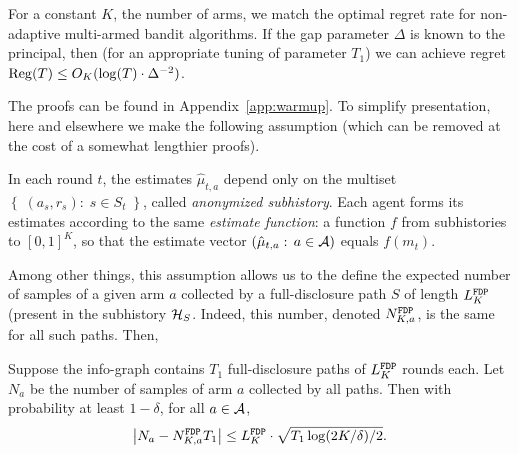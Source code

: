 \begin{remark}
For a constant $K$, the number of arms, we match the optimal regret rate for non-adaptive multi-armed bandit algorithms. If the gap parameter $\Delta$ is known to the principal, then (for an appropriate tuning of parameter $T_1$) we can achieve regret
  $\mathrm{Reg}(T) \leq O_K(\log(T) \cdot \Delta^{-2})$.
\end{remark}

The proofs can be found in Appendix~\ref{app:warmup}. To simplify presentation, here and elsewhere we make the following assumption (which can be removed at the cost of a somewhat lengthier proofs).


\begin{assumption}\label{ass:simplifying}
In each round $t$, the estimates $\hat{\mu}_{t,a}$ depend only on the multiset
    $\left\{\; (a_s,r_s):\;s\in S_t \;\right\}$,
called \emph{anonymized subhistory}. Each agent forms its estimates according to the same \emph{estimate function}: a function $f$ from subhistories to $[0,1]^K$, so that the estimate vector
        $(\hat{\mu}_{t,a}:\, a\in\mathcal{A})$
equals $f(m_t)$.
\end{assumption}

Among other things, this assumption allows us to the define the expected number of samples of a given arm $a$ collected by a full-disclosure path $S$ of length $L^\mathtt{FDP}_K$ (\ie present in the subhistory $\mathcal{H}_{S}$. Indeed, this number, denoted $N^\mathtt{FDP}_{K,a}$, is the same for all such paths. Then,

\begin{lemma}\label{lem:t1runs}
Suppose the info-graph contains $T_1$ full-disclosure paths of $L^\mathtt{FDP}_K$ rounds each. Let $N_a$ be the number of samples of arm $a$ collected by all paths. Then with probability at
  least $1-\delta$, for all $a\in \mathcal{A}$,
  \[
    \left| N_a - N^\mathtt{FDP}_{K,a} T_1\right| \leq L^\mathtt{FDP}_K\cdot \sqrt{T_1 \log(2K/\delta) / 2}.
  \]
\end{lemma}






